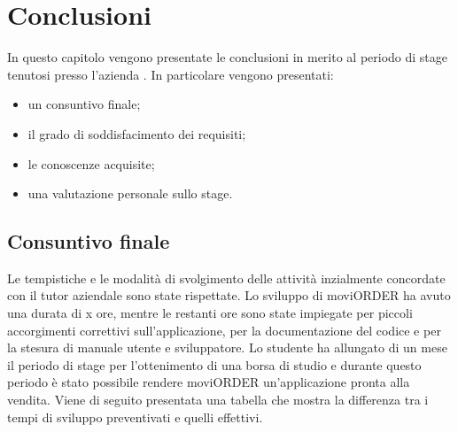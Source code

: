 
\chapter{Conclusioni}
\label{cap:conclusioni}
In questo capitolo vengono presentate le conclusioni in merito al periodo di stage tenutosi presso l'azienda \visione{}. In particolare vengono presentati:
\begin{itemize}
	\item un consuntivo finale;
	\item il grado di soddisfacimento dei requisiti;
	\item le conoscenze acquisite;
	\item una valutazione personale sullo stage.
\end{itemize}
\section{Consuntivo finale}

Le tempistiche e le modalità di svolgimento delle attività inzialmente concordate con il tutor aziendale sono state rispettate. Lo sviluppo di moviORDER ha avuto una durata di x ore, mentre le restanti ore sono state impiegate per piccoli accorgimenti correttivi sull'applicazione, per la documentazione del codice e per la stesura di manuale utente e sviluppatore. Lo studente ha allungato di un mese il periodo di stage per l'ottenimento di una borsa di studio e durante questo periodo è stato possibile rendere moviORDER un'applicazione pronta alla vendita. Viene di seguito presentata una tabella che mostra la differenza tra i tempi di sviluppo preventivati e quelli effettivi.


